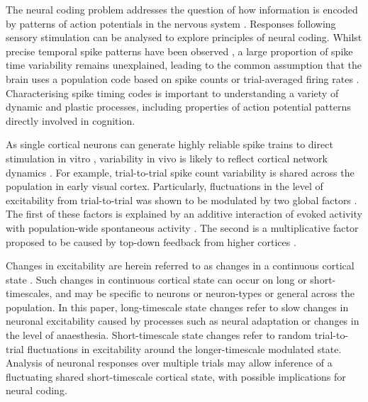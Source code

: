 \documentclass{article}
\begin{document}
The neural coding problem addresses the question of how information is encoded by patterns of action potentials in the nervous system \cite{gerstner1997neural, johnson2000neural, stein2005neuronal, gerstner2014neuronal}. Responses following sensory stimulation can be analysed to explore principles of neural coding.
Whilst precise temporal spike patterns have been observed \cite{uzzell2004precision, johansson2004first, gollisch2008rapid, storchi2012comparison, reinagel2002precise, reyes2014laminar}, a large proportion of spike time variability remains unexplained, leading to the common assumption that the brain uses a population code based on spike counts \cite{reyes2015high, lin2015nature} or trial-averaged firing rates \cite{hong2016explicit, chang2017code, kar2019evidence, stringer2019high}. Characterising spike timing codes is important to understanding a variety of dynamic and plastic processes, including properties of action potential patterns directly involved in cognition.


As single cortical neurons can generate highly reliable spike trains to direct stimulation in vitro \cite{mainen1995reliability}, variability in vivo is likely to reflect 
cortical network dynamics \cite{carandini2004amplification}. 
For example, trial-to-trial spike count variability is shared across the population \cite{scholvinck2015cortical, lin2015nature} in early visual cortex.
Particularly, fluctuations in the level of excitability from trial-to-trial was shown to be modulated by two global factors \cite{lin2015nature}. The first of these factors is explained by an additive interaction of evoked activity with population-wide spontaneous activity \cite{arieli1996dynamics, scholvinck2015cortical}. The second is a multiplicative factor proposed to be caused by top-down feedback from higher cortices \cite{lin2015nature}. 



Changes in excitability are herein referred to as changes in a continuous cortical state \cite{scholvinck2015cortical}.
Such changes in continuous cortical state can occur on long or short-timescales, and may be specific to neurons or neuron-types or general across the population.
In this paper, long-timescale state changes refer to slow changes in neuronal excitability caused by processes such as neural adaptation \cite{dragoi2002dynamics, ulanovsky2003processing, sharpee2006adaptive} or changes in the level of anaesthesia. Short-timescale state changes refer to random trial-to-trial fluctuations in excitability around the longer-timescale modulated state. Analysis of neuronal responses over multiple trials may allow inference of a fluctuating shared short-timescale cortical state, with possible implications for neural coding. 
\end{document}

